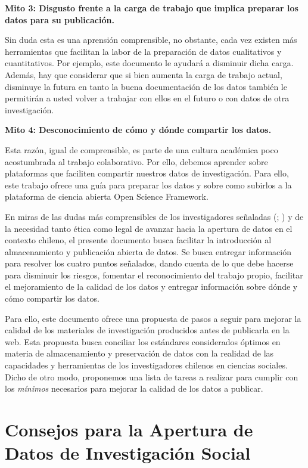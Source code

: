 \documentclass[
  spanish,
  a4paper,
  oneside]{scrbook}
\begin{document}
\textbf{Mito 3: Disgusto frente a la carga de trabajo que implica
preparar los datos para su publicación.}

Sin duda esta es una aprensión comprensible, no obstante, cada vez
existen más herramientas que facilitan la labor de la preparación de
datos cualitativos y cuantitativos. Por ejemplo, este documento le
ayudará a disminuir dicha carga. Además, hay que considerar que si bien
aumenta la carga de trabajo actual, disminuye la futura en tanto la
buena documentación de los datos también le permitirán a usted volver a
trabajar con ellos en el futuro o con datos de otra investigación.

\textbf{Mito 4: Desconocimiento de cómo y dónde compartir los datos.}

Esta razón, igual de comprensible, es parte de una cultura académica
poco acostumbrada al trabajo colaborativo. Por ello, debemos aprender
sobre plataformas que faciliten compartir nuestros datos de
investigación. Para ello, este trabajo ofrece una guía para preparar los
datos y sobre como subirlos a la plataforma de ciencia abierta Open
Science Framework.

En miras de las dudas más comprensibles de los investigadores señaladas
(;
) y de la necesidad tanto
ética como legal de avanzar hacia la apertura de datos en el contexto
chileno, el presente documento busca facilitar la introducción al
almacenamiento y publicación abierta de datos. Se busca entregar
información para resolver los cuatro puntos señalados, dando cuenta de
lo que debe hacerse para disminuir los riesgos, fomentar el
reconocimiento del trabajo propio, facilitar el mejoramiento de la
calidad de los datos y entregar información sobre dónde y cómo compartir
los datos.

Para ello, este documento ofrece una propuesta de pasos a seguir para
mejorar la calidad de los materiales de investigación producidos antes
de publicarla en la web. Esta propuesta busca conciliar los estándares
considerados óptimos en materia de almacenamiento y preservación de
datos con la realidad de las capacidades y herramientas de los
investigadores chilenos en ciencias sociales. Dicho de otro modo,
proponemos una lista de tareas a realizar para cumplir con los
\emph{mínimos} necesarios para mejorar la calidad de los datos a
publicar.

\chapter{Consejos para la Apertura de Datos de Investigación
Social}\label{consejos-para-la-apertura-de-datos-de-investigaciuxf3n-social}
\end{document}
